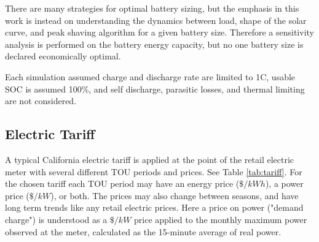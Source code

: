 \documentclass[journal,article,submit,pdftex,moreauthors]{Definitions/mdpi}
\begin{document}
There are many strategies for optimal battery sizing, but the emphasis
in this work is instead on understanding the dynamics between load,
shape of the solar curve, and peak shaving algorithm for a given battery
size. Therefore a sensitivity analysis is performed on the battery
energy capacity, but no one battery size is declared economically
optimal.

Each simulation assumed charge and discharge rate are limited to 1C,
usable SOC is assumed 100\%, and self discharge, parasitic losses, and
thermal limiting are not considered.

\subsection{Electric Tariff}\label{electric-tariff}%

A typical California electric tariff is applied at the point of the
retail electric meter with several different TOU periods and prices. See Table \ref{tab:tariff}.
For the chosen tariff each TOU period may have an energy price
(\(\$/kWh\)), a power price (\(\$/kW\)), or both. The prices may also
change between seasons, and have long term trends like any retail
electric prices. Here a price on power ("demand charge") is understood
as a \(\$/kW\) price applied to the monthly maximum power observed at
the meter, calculated as the 15-minute average of real power.
\end{document}
